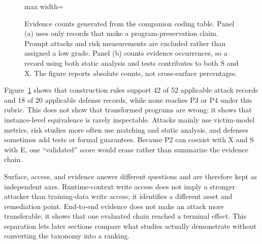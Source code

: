 \documentclass[acmsmall,screen,review]{acmart}
\begin{document}
\begin{figure}[t]
\begin{adjustbox}{max width=\textwidth}
\end{adjustbox}
\caption{Evidence counts generated from the companion coding table. Panel (a) uses only records that make a program-preservation claim. Prompt attacks and risk measurements are excluded rather than assigned a low grade. Panel (b) counts evidence occurrences, so a record using both static analysis and tests contributes to both \textsf{S} and \textsf{X}. The figure reports absolute counts, not cross-surface percentages.}
\label{fig:evidence}
\end{figure}

Figure~\ref{fig:evidence} shows that construction rules support 42 of 52 applicable attack records and 18 of 20 applicable defense records, while none reaches P3 or P4 under this rubric. This does not show that transformed programs are wrong; it shows that instance-level equivalence is rarely inspectable. Attacks mainly use victim-model metrics, risk studies more often use matching and static analysis, and defenses sometimes add tests or formal guarantees. Because P2 can coexist with X and S with E, one ``validated'' score would erase rather than summarize the evidence chain.

Surface, access, and evidence answer different questions and are therefore kept as independent axes. Runtime-context write access does not imply a stronger attacker than training-data write access; it identifies a different asset and remediation point. End-to-end evidence does not make an attack more transferable; it shows that one evaluated chain reached a terminal effect. This separation lets later sections compare what studies actually demonstrate without converting the taxonomy into a ranking.
\end{document}
